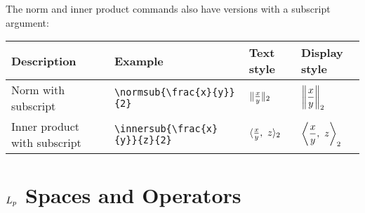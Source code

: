 \documentclass{article}
\begin{document}
The norm and inner product commands also have versions with a subscript argument:

\begin{center}
\begin{tabular}{@{}llll@{}}
\toprule
Description				& Example 					& Text style 				& Display style \\ \midrule
Norm	with subscript				& \verb!\normsub{\frac{x}{y}}{2}!       	& $\normsub{\frac{x}{y}}{2}$ 	& $\displaystyle\normsub{\frac{x}{y}}{2}$ \\[10pt]
Inner product with subscript			& \verb!\innersub{\frac{x}{y}}{z}{2}!       	& $\innersub{\frac{x}{y}}{z}{2}$ 	& $\displaystyle\innersub{\frac{x}{y}}{z}{2}$ \\[10pt]
\bottomrule
\end{tabular}
\end{center}


\section{$L_{p}$ Spaces and Operators}
\end{document}
